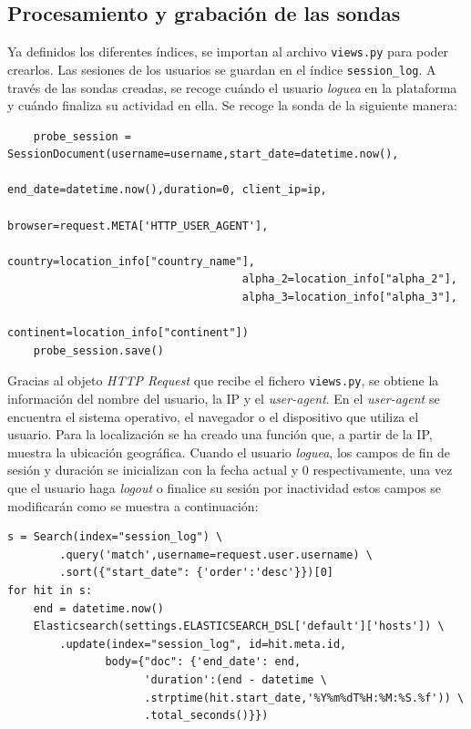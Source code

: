\subsection{Procesamiento y grabación de las sondas}
Ya definidos los diferentes índices, se importan al archivo \texttt{views.py} para poder crearlos. Las sesiones de los usuarios se guardan en el índice \texttt{session\_log}. A través de las sondas creadas, se recoge cuándo el usuario \textit{loguea} en la plataforma y cuándo finaliza su actividad en ella. Se recoge la sonda de la siguiente manera:
\\
{\footnotesize
\begin{verbatim}
    probe_session = SessionDocument(username=username,start_date=datetime.now(),
                                    end_date=datetime.now(),duration=0, client_ip=ip,
                                    browser=request.META['HTTP_USER_AGENT'],
                                    country=location_info["country_name"],
                                    alpha_2=location_info["alpha_2"], 
                                    alpha_3=location_info["alpha_3"],
                                    continent=location_info["continent"])
    probe_session.save()
\end{verbatim}
}
Gracias al objeto \textit{HTTP Request} que recibe el fichero \texttt{views.py}, se obtiene la información del nombre del usuario, la IP y el \textit{user-agent}. En el \textit{user-agent} se encuentra el sistema operativo, el navegador o el dispositivo que utiliza el usuario. Para la localización se ha creado una función que, a partir de la IP, muestra la ubicación geográfica. Cuando el usuario \textit{loguea}, los campos de fin de sesión y duración se inicializan con la fecha actual y 0 respectivamente, una vez que el usuario haga \textit{logout} o finalice su sesión por inactividad estos campos se modificarán como se muestra a continuación:\\

\begin{verbatim}
s = Search(index="session_log") \
        .query('match',username=request.user.username) \
        .sort({"start_date": {'order':'desc'}})[0]
for hit in s:
    end = datetime.now()
    Elasticsearch(settings.ELASTICSEARCH_DSL['default']['hosts']) \
        .update(index="session_log", id=hit.meta.id,
               body={"doc": {'end_date': end,
                     'duration':(end - datetime \
                     .strptime(hit.start_date,'%Y%m%dT%H:%M:%S.%f')) \
                     .total_seconds()}})
\end{verbatim}

